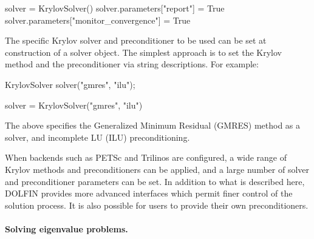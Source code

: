 \begin{python}
solver = KrylovSolver()
solver.parameters["report"] = True
solver.parameters["monitor_convergence"] = True
\end{python}
The specific Krylov solver and preconditioner to be used can be set at
construction of a solver object. The simplest approach is to set the
Krylov method and the preconditioner via string descriptions. For example:

\begin{c++}
KrylovSolver solver("gmres", "ilu");
\end{c++}

\begin{python}
solver = KrylovSolver("gmres", "ilu")
\end{python}
The above specifies the Generalized Minimum Residual (GMRES) method as
a solver, and incomplete LU (ILU) preconditioning.


When backends such as PETSc and Trilinos are configured, a wide range
of Krylov methods and preconditioners can be applied, and a large
number of solver and preconditioner parameters can be set. In addition
to what is described here, DOLFIN provides more advanced interfaces
which permit finer control of the solution process. It is also
possible for users to provide their own preconditioners.

\paragraph{Solving eigenvalue problems.}


